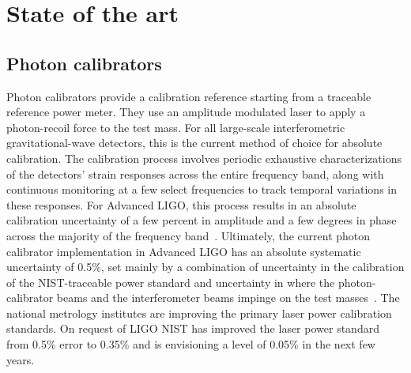 
\section{State of the art}
\subsection{Photon calibrators}
Photon calibrators provide a calibration reference starting from a traceable reference power meter. They use an amplitude modulated laser to apply a photon-recoil force to the test mass. For all large-scale interferometric gravitational-wave detectors, this is the current method of choice for absolute calibration.
The calibration process involves periodic exhaustive characterizations of the detectors' strain responses across the entire frequency band, along with continuous monitoring at a few select frequencies to track temporal variations in these responses.
For Advanced LIGO, this process results in an absolute calibration uncertainty of a few percent in amplitude and a few degrees in phase across the majority of the frequency band~\cite{PhysRevD.96.102001}.
Ultimately, the current photon calibrator implementation in Advanced LIGO has an absolute systematic uncertainty of 0.5\%, set mainly by a combination of uncertainty in the calibration of the NIST-traceable power standard and uncertainty in where the photon-calibrator beams and the interferometer beams impinge on the test masses~\cite{doi:10.1063/1.4967303, NISTWorkshop2019
}. The national metrology institutes are improving the primary laser power calibration standards. On request of LIGO NIST has improved the laser power standard from 0.5\% error to 0.35\% and is envisioning a level of 0.05\% in the next few years.


